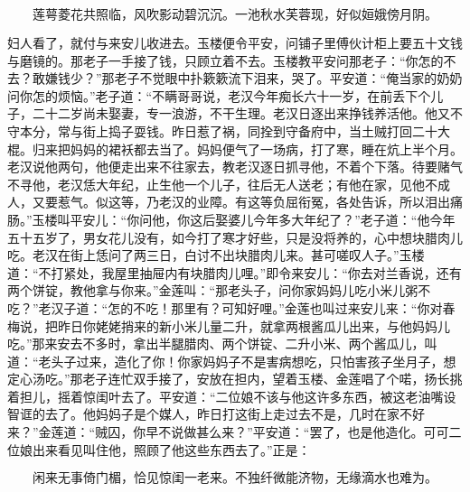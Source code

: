 \[
莲萼菱花共照临，风吹影动碧沉沉。
一池秋水芙蓉现，好似姮娥傍月阴。
\]

妇人看了，就付与来安儿收进去。玉楼便令平安，问铺子里傅伙计柜上要五十文钱与磨镜的。那老子一手接了钱，只顾立着不去。玉楼教平安问那老子：“你怎的不去？敢嫌钱少？”那老子不觉眼中扑簌簌流下泪来，哭了。平安道：“俺当家的奶奶问你怎的烦恼。”老子道：“不瞒哥哥说，老汉今年痴长六十一岁，在前丢下个儿子，二十二岁尚未娶妻，专一浪游，不干生理。老汉日逐出来挣钱养活他。他又不守本分，常与街上捣子耍钱。昨日惹了祸，同拴到守备府中，当土贼打回二十大棍。归来把妈妈的裙袄都去当了。妈妈便气了一场病，打了寒，睡在炕上半个月。老汉说他两句，他便走出来不往家去，教老汉逐日抓寻他，不着个下落。待要赌气不寻他，老汉恁大年纪，止生他一个儿子，往后无人送老；有他在家，见他不成人，又要惹气。似这等，乃老汉的业障。有这等负屈衔冤，各处告诉，所以泪出痛肠。”玉楼叫平安儿：“你问他，你这后娶婆儿今年多大年纪了？”老子道：“他今年五十五岁了，男女花儿没有，如今打了寒才好些，只是没将养的，心中想块腊肉儿吃。老汉在街上恁问了两三日，白讨不出块腊肉儿来。甚可嗟叹人子。”玉楼道：“不打紧处，我屋里抽屉内有块腊肉儿哩。”即令来安儿：“你去对兰香说，还有两个饼锭，教他拿与你来。”金莲叫：“那老头子，问你家妈妈儿吃小米儿粥不吃？”老汉子道：“怎的不吃！那里有？可知好哩。”金莲也叫过来安儿来：“你对春梅说，把昨日你姥姥捎来的新小米儿量二升，就拿两根酱瓜儿出来，与他妈妈儿吃。”那来安去不多时，拿出半腿腊肉、两个饼锭、二升小米、两个酱瓜儿，叫道：“老头子过来，造化了你！你家妈妈子不是害病想吃，只怕害孩子坐月子，想定心汤吃。”那老子连忙双手接了，安放在担内，望着玉楼、金莲唱了个喏，扬长挑着担儿，摇着惊闺叶去了。平安道：“二位娘不该与他这许多东西，被这老油嘴设智诓的去了。他妈妈子是个媒人，昨日打这街上走过去不是，几时在家不好来？”金莲道：“贼囚，你早不说做甚么来？”平安道：“罢了，也是他造化。可可二位娘出来看见叫住他，照顾了他这些东西去了。”正是：

\[
闲来无事倚门楣，恰见惊闺一老来。
不独纤微能济物，无缘滴水也难为。
\]
